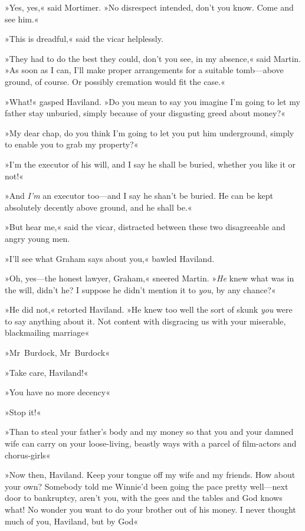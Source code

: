 »Yes, yes,« said Mortimer. »No disrespect intended, don't you know. Come and see him.«

»This is dreadful,« said the vicar helplessly.

»They had to do the best they could, don't you see, in my absence,« said Martin. »As soon as I can, I'll make proper arrangements for a suitable tomb—above ground, of course. Or possibly cremation would fit the case.«

»What!« gasped Haviland. »Do you mean to say you imagine I'm going to let my father stay unburied, simply because of your disgusting greed about money?«

»My dear chap, do you think I'm going to let you put him underground, simply to enable you to grab my property?«

»I'm the executor of his will, and I say he shall be buried, whether you like it or not!«

»And \textit{I'm} an executor too—and I say he shan't be buried. He can be kept absolutely decently above ground, and he shall be.«

»But hear me,« said the vicar, distracted between these two disagreeable and angry young men.

»I'll see what Graham says about you,« bawled Haviland.

»Oh, yes—the honest lawyer, Graham,« sneered Martin. »\textit{He} knew what was in the will, didn't he? I suppose he didn't mention it to \textit{you}, by any chance?«

»He did not,« retorted Haviland. »He knew too well the sort of skunk \textit{you} were to say anything about it. Not content with disgracing us with your miserable, blackmailing marriage\longdash«

»Mr~Burdock, Mr~Burdock\longdash«

»Take care, Haviland!«

»You have no more decency\longdash«

»Stop it!«

»Than to steal your father's body and my money so that you and your damned wife can carry on your loose-living, beastly ways with a parcel of film-actors and chorus-girls\longdash«

»Now then, Haviland. Keep your tongue off my wife and my friends. How about your own? Somebody told me Winnie'd been going the pace pretty well—next door to bankruptcy, aren't you, with the gees and the tables and God knows what! No wonder you want to do your brother out of his money. I never thought much of you, Haviland, but by God\longdash«

